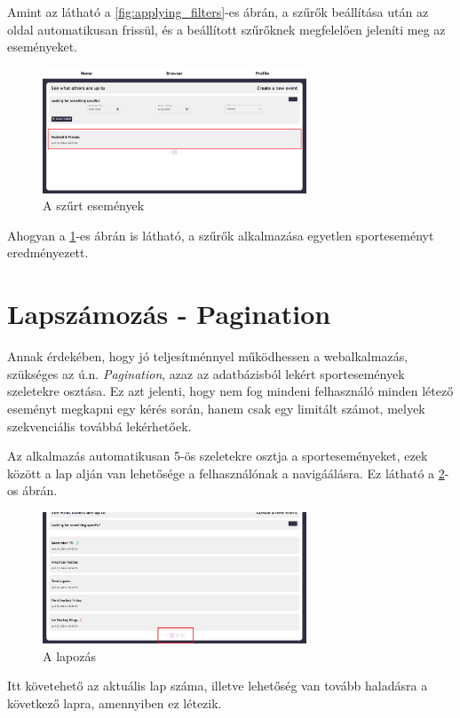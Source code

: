 Amint az látható a \ref{fig:applying_filters}-es ábrán, a szűrők beállítása után az oldal automatikusan frissül, és a beállított szűrőknek megfelelően
jeleníti meg az eseményeket. 

\begin{figure}
	\centering
	\includegraphics[width=0.7\textwidth]{images/filtering_events_5.png}
	\caption{A szűrt események}
	\label{fig:filtered_events}
\end{figure}

Ahogyan a \ref{fig:filtered_events}-es ábrán is látható, a szűrők alkalmazása egyetlen sporteseményt eredményezett.

\newpage
\section{Lapszámozás - Pagination}

Annak érdekében, hogy jó teljesítménnyel működhessen a webalkalmazás, szükséges az ú.n. \textit{Pagination}\cite{paginationdocs}, azaz az adatbázisból lekért sportesemények
szeletekre osztása. Ez azt jelenti, hogy nem fog mindeni felhasználó minden létező eseményt megkapni egy kérés során, hanem csak egy limitált számot,
melyek szekvenciális továbbá lekérhetőek.

Az alkalmazás automatikusan 5-ös szeletekre osztja a sporteseményeket, ezek között a lap alján van lehetősége a felhasználónak a navigáálásra. Ez látható a \ref{fig:pagination}-os ábrán.

\begin{figure}[ht]
	\centering
	\includegraphics[width=0.7\textwidth]{images/pagination_1.png}
	\caption{A lapozás}
	\label{fig:pagination}
\end{figure}

Itt követehető az aktuális lap száma, illetve lehetőség van tovább haladásra a következő lapra, amennyiben ez létezik.